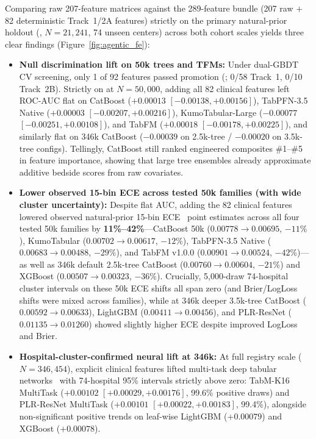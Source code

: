Comparing raw 207-feature matrices against the 289-feature bundle (207 raw $+$ 82 deterministic Track~1/2A features) strictly on the primary natural-prior holdout (, $N=21{,}241$, 74 unseen centers) across both cohort scales yields three clear findings (Figure~\ref{fig:agentic_fe}):
\begin{itemize}
  \item \textbf{Null discrimination lift on 50k trees and TFMs:} Under dual-GBDT CV screening, only 1 of 92 features passed promotion (; 0/58 Track~1, 0/10 Track~2B). Strictly on  at $N=50{,}000$, adding all 82 clinical features left ROC-AUC flat on CatBoost ($+0.00013$ $[-0.00138, +0.00156]$), TabPFN-3.5 Native ($+0.00003$ $[-0.00207, +0.00216]$), KumoTabular-Large ($-0.00077$ $[-0.00251, +0.00108]$), and TabFM ($+0.00018$ $[-0.00178, +0.00225]$), and similarly flat on 346k CatBoost ($-0.00039$ on 2.5k-tree / $-0.00020$ on 3.5k-tree configs). Tellingly, CatBoost still ranked engineered composites \#1--\#5 in feature importance, showing that large tree ensembles already approximate additive bedside scores from raw covariates.
  \item \textbf{Lower observed 15-bin ECE across tested 50k families (with wide cluster uncertainty):} Despite flat AUC, adding the 82 clinical features lowered observed natural-prior 15-bin ECE~\cite{guo2017calibration,vancalster2019calibration} point estimates across all four tested 50k families by \textbf{11\%--42\%}---CatBoost 50k ($0.00778 \to 0.00695$, $-11\%$), KumoTabular ($0.00702 \to 0.00617$, $-12\%$), TabPFN-3.5 Native ($0.00683 \to 0.00488$, $-29\%$), and TabFM v1.0.0 ($0.00901 \to 0.00524$, $-42\%$)---as well as 346k default 2.5k-tree CatBoost ($0.00760 \to 0.00604$, $-21\%$) and XGBoost ($0.00507 \to 0.00323$, $-36\%$). Crucially, 5,000-draw 74-hospital cluster intervals on these 50k ECE shifts all span zero (and Brier/LogLoss shifts were mixed across families), while at 346k deeper 3.5k-tree CatBoost ($0.00592 \to 0.00633$), LightGBM ($0.00411 \to 0.00456$), and PLR-ResNet ($0.01135 \to 0.01260$) showed slightly higher ECE despite improved LogLoss and Brier.
  \item \textbf{Hospital-cluster-confirmed neural lift at 346k:} At full registry scale ($N=346{,}454$), explicit clinical features lifted multi-task deep tabular networks~\cite{caruana1997multitask,gorishniy2022embeddings,gorishniy2025tabm} with 74-hospital 95\% intervals strictly above zero: TabM-K16 MultiTask ($+0.00102$ $[+0.00029, +0.00176]$, 99.6\% positive draws) and PLR-ResNet MultiTask ($+0.00101$ $[+0.00022, +0.00183]$, 99.4\%), alongside non-significant positive trends on leaf-wise LightGBM ($+0.00079$) and XGBoost ($+0.00078$).
\end{itemize}
